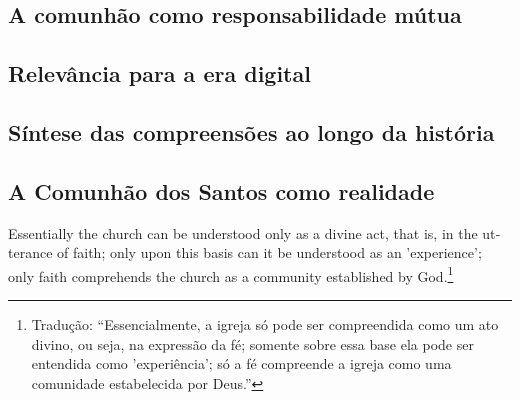 \subsection{A comunhão como responsabilidade mútua}

\subsection{Relevância para a era digital}

\subsection{Síntese das compreensões ao longo da história}

\subsection{A Comunhão dos Santos como realidade}

\begin{citacao}
\foreignlanguage{english}{Essentially the church can be understood only as a divine act, that is, in the utterance of faith; only upon this basis can it be understood as an 'experience'; only faith comprehends the church as a community established by God.}\footnote{Tradução: ``Essencialmente, a igreja só pode ser compreendida como um ato divino, ou seja, na expressão da fé; somente sobre essa base ela pode ser entendida como 'experiência'; só a fé compreende a igreja como uma comunidade estabelecida por Deus.''} \cite[p. 195]{bonhoeffer1963}
\end{citacao}
